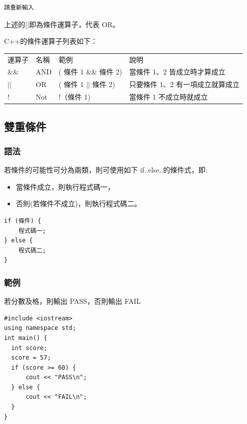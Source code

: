\documentclass[12pt,a4paper]{article}
\begin{document}
\begin{verbatim}
請重新輸入
\end{verbatim}


上述的||即為條件運算子，代表 OR。

C++的條件運算子列表如下：
\begin{center}
\begin{tabular}{llll}
運算子 & 名稱 & 範例 & 說明\\
\&\& & AND & ( 條件 1 \&\& 條件 2) & 當條件 1、2 皆成立時才算成立\\
\(\vert{} \vert{}\) & OR & ( 條件 1 \(\vert{} \vert{}\) 條件 2) & 只要條件 1、2 有一項成立就算成立\\
! & Not & !（條件 1) & 當條件 1 不成立時就成立\\
\end{tabular}
\end{center}

\subsection{雙重條件}
\label{sec:orgbeee903}
\subsubsection{語法}
\label{sec:org3f600dd}
若條件的可能性可分為兩類，則可使用如下 if..else..的條件式，即:
\begin{itemize}
\item 當條件成立，則執行程式碼一，
\item 否則(若條件不成立)，則執行程式碼二。
\end{itemize}
\lstset{breaklines=true,language=cpp,label= ,caption= ,captionpos=b,numbers=none}
\begin{lstlisting}
if (條件) {
    程式碼一;
} else {
    程式碼二;
}
\end{lstlisting}

\subsubsection{範例}
\label{sec:org0fb44df}
若分數及格，則輸出 PASS，否則輸出 FAIL
\lstset{breaklines=true,language=cpp,label= ,caption= ,captionpos=b,firstnumber=1,numbers=left}
\begin{lstlisting}
#include <iostream>
using namespace std;
int main() {
  int score;
  score = 57;
  if (score >= 60) {
      cout << "PASS\n";
  } else {
      cout << "FAIL\n";
  }
}
\end{lstlisting}
\end{document}
